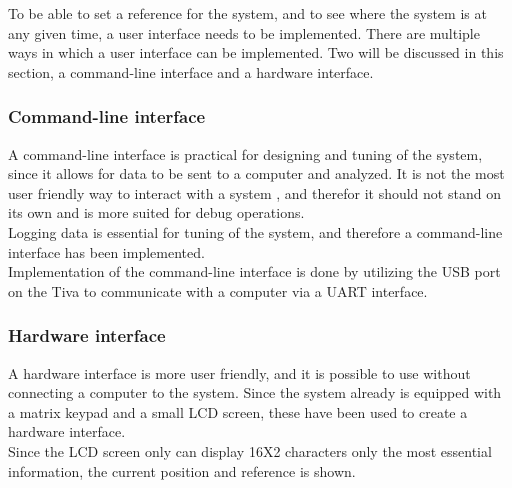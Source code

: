 \documentclass[../../../main]{subfiles}
\begin{document}
To be able to set a reference for the system, and to see where the system  is at any given time, a user interface needs to be implemented.
There are multiple ways in which a user interface can be implemented.
Two will be discussed in this section, a command-line interface and a hardware interface.

\subsubsection{Command-line interface}%
\label{ssub:command-line_interface}
A command-line interface is practical for designing and tuning of the system, since it allows for data to be sent to a computer and analyzed.
It is not the most user friendly way to interact with a system , and therefor it should not stand on its own and is more suited for debug operations.
\\
Logging data is essential for tuning of the system, and therefore a command-line interface has been implemented.
\\
Implementation of the command-line interface is done  by utilizing the USB port on the Tiva  to communicate with a computer via a UART interface.

\subsubsection{Hardware interface}%
\label{ssub:hardware_interface}
A hardware interface is more user friendly, and it is possible to use without connecting a computer to the system.
Since the system already is equipped with a matrix keypad and a small LCD screen, these have been used to create a hardware interface.
\\
Since the LCD screen only can display 16X2 characters only the most essential information, the current position and reference is shown.
\end{document}
